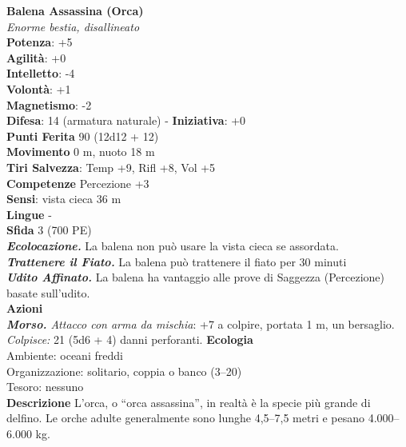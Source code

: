 \begin{multicols}{2}
\medskip\textbf{Balena Assassina (Orca)}\\
\emph{Enorme bestia, disallineato}\\
\textbf{Potenza}: +5\\
\textbf{Agilità}: +0\\
\textbf{Intelletto}: -4\\
\textbf{Volontà}: +1\\
\textbf{Magnetismo}: -2\\
\textbf{Difesa}: 14 (armatura naturale) - \textbf{Iniziativa}: +0\\
\textbf{Punti Ferita} 90 (12d12 + 12)\\
\textbf{Movimento} 0 m, nuoto 18 m\\
\textbf{Tiri Salvezza}: Temp +9, Rifl +8, Vol +5\\
\textbf{Competenze} Percezione +3\\
\textbf{Sensi}: vista cieca 36 m\\
\textbf{Lingue} -\\
\textbf{Sfida} 3 (700 PE)\smallskip\\
\emph{\textbf{Ecolocazione.}} La balena non può usare la vista cieca se assordata.\\
\emph{\textbf{Trattenere il Fiato.}} La balena può trattenere il fiato per 30 minuti\\
\emph{\textbf{Udito Affinato.}} La balena ha vantaggio alle prove di Saggezza (Percezione) basate sull'udito.\\
\smallskip\textbf{Azioni}\\
\emph{\textbf{Morso.} Attacco con arma da mischia}: +7 a colpire, portata 1 m, un bersaglio.\\
\emph{Colpisce:} 21 (5d6 + 4) danni perforanti.
\textbf{Ecologia}\\
Ambiente: oceani freddi\\
Organizzazione: solitario, coppia o banco (3–20)\\
Tesoro: nessuno\\
\textbf{Descrizione}
L’orca, o “orca assassina”, in realtà è la specie più grande di delfino. Le orche adulte generalmente sono lunghe 4,5–7,5 metri e pesano 4.000–6.000 kg.\\


\end{multicols}
